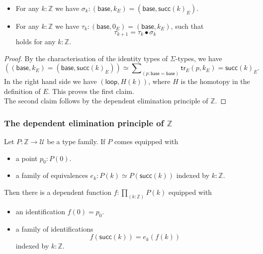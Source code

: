 \documentclass[handout]{beamer}
\newcommand{\Z}{\mathbb{Z}}
\newcommand{\UU}{\mathcal{U}}
\newcommand{\baseS}{\mathsf{base}}
\newcommand{\loopS}{\mathsf{loop}}
\newcommand{\tr}{\mathsf{tr}}
\newcommand{\succZ}{\mathsf{succ}}
\begin{document}
\begin{frame}
  \begin{lemma}[Helix]
    \begin{itemize}
    \item For any $k:\Z$ we have $\sigma_k:(\baseS,k_E)=(\baseS,\succZ(k)_E)$.
    \item For any $k:\Z$ we have $\tau_k:(\baseS,0_E)=(\baseS,k_E)$, such that 
      \begin{equation*}
        \tau_{k+1}=\tau_k\bullet \sigma_k
      \end{equation*}
      holds for any $k:\Z$.
    \end{itemize}
  \end{lemma}

  \begin{proof}
    By the characterisation of the identity types of $\Sigma$-types, we have
    \begin{equation*}
      ((\baseS,k_E)=(\baseS,\succZ(k)_E)) \simeq \sum\nolimits_{(p:\baseS=\baseS)}\tr_E(p,k_E)=\succZ(k)_E.
    \end{equation*}
    In the right hand side we have $(\loopS,H(k))$, where $H$ is the homotopy in the definition of $E$. This proves the first claim.\\[1em]

    The second claim follows by the dependent elimination principle of $\Z$.
  \end{proof}
\end{frame}

\begin{frame}
  \frametitle{The dependent elimination principle of $\Z$}
  \begin{theorem}
    Let $P:\Z\to\UU$ be a type family. If $P$ comes equipped with
    \begin{itemize}
    \item a point $p_0:P(0)$.
    \item a family of equivalences $e_k:P(k)\simeq P(\succZ(k))$ indexed by $k:\Z$.
    \end{itemize}\pause
    Then there is a dependent function $f:\prod_{(k:\Z)}P(k)$ equipped with
    \begin{itemize}
    \item an identification $f(0)=p_0$.
    \item a family of identifications
      \begin{equation*}
        f(\succZ(k))=e_k(f(k))
      \end{equation*}
      indexed by $k:\Z$.
    \end{itemize}
  \end{theorem}
\end{frame}
\end{document}
